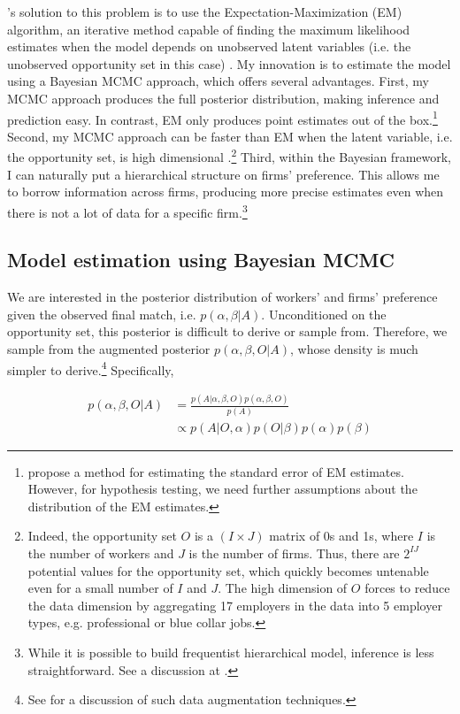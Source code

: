 \citet{Logan1998}'s solution to this problem is to use the
Expectation-Maximization (EM) algorithm, an iterative method capable of finding
the maximum likelihood estimates when the model depends on unobserved latent
variables (i.e. the unobserved opportunity set in this case)
\citep{Dempster1977}. My innovation is to estimate the model using a Bayesian
MCMC approach, which offers several advantages. First, my MCMC approach
produces the full posterior distribution, making inference and prediction easy.
In contrast, EM only produces point estimates out of the
box.\footnote{\citet{Jamshidian2000} propose a method for estimating the
  standard error of EM estimates. However, for hypothesis testing, we need
  further assumptions about the distribution of the EM estimates.} Second, my
MCMC approach can be faster than EM when the latent variable, i.e. the
opportunity set, is high dimensional \citep{Ryden2008}.\footnote{Indeed, the
  opportunity set $O$ is a $(I \times J)$ matrix of 0s and 1s, where $I$ is the
  number of workers and $J$ is the number of firms. Thus, there are $2^{IJ}$
  potential values for the opportunity set, which quickly becomes untenable even
  for a small number of $I$ and $J$. The high dimension of $O$ forces
  \citet{Logan1998} to reduce the data dimension by aggregating 17 employers in
  the data into 5 employer types, e.g. professional or blue collar jobs.} Third,
within the Bayesian framework, I can naturally put a hierarchical structure on
firms' preference. This allows me to borrow information across firms, producing
more precise estimates even when there is not a lot of data for a specific
firm.\footnote{While it is possible to build frequentist hierarchical model,
  inference is less straightforward. See a discussion at \citet{Hornik2017}.}

\subsection{Model estimation using Bayesian MCMC}

We are interested in the posterior distribution of workers' and firms'
preference given the observed final match, i.e. $p(\alpha, \beta | A)$.
Unconditioned on the opportunity set, this posterior is difficult to derive or
sample from. Therefore, we sample from the augmented posterior $p(\alpha, \beta,
O | A)$, whose density is much simpler to derive.\footnote{See
  \citet{Tanner1987} for a discussion of such data augmentation techniques.}
Specifically,

\begin{align}
  p(\alpha, \beta, O | A) &= \frac{p(A | \alpha, \beta, O) p(\alpha, \beta, O)}{p(A)} \\
                          &\propto p(A|O, \alpha) p(O|\beta) p(\alpha) p(\beta) 
                            \label{eq:posterior_density}
\end{align}

